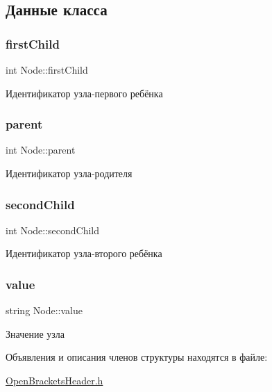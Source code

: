 \subsection{Данные класса}
\mbox{\label{struct_node_a6ed10d6fbe8f8c2f08d18dd10a89f872}} 
\subsubsection{\texorpdfstring{first\+Child}{firstChild}}
{\footnotesize\ttfamily int Node\+::first\+Child}



Идентификатор узла-\/первого ребёнка 

\mbox{\label{struct_node_a122e2ce83616f32faa022223be3f50ab}} 
\subsubsection{\texorpdfstring{parent}{parent}}
{\footnotesize\ttfamily int Node\+::parent}



Идентификатор узла-\/родителя 

\mbox{\label{struct_node_a5ae4e8db98829aa5a678560df5ddd7ee}} 
\subsubsection{\texorpdfstring{second\+Child}{secondChild}}
{\footnotesize\ttfamily int Node\+::second\+Child}



Идентификатор узла-\/второго ребёнка 

\mbox{\label{struct_node_afbfe6bbcc5e6d53bb23ff4c29c178596}} 
\subsubsection{\texorpdfstring{value}{value}}
{\footnotesize\ttfamily string Node\+::value}



Значение узла 



Объявления и описания членов структуры находятся в файле\+:\begin{DoxyCompactItemize}
\item 
\mbox{\hyperlink{_open_brackets_header_8h}{Open\+Brackets\+Header.\+h}}\end{DoxyCompactItemize}
